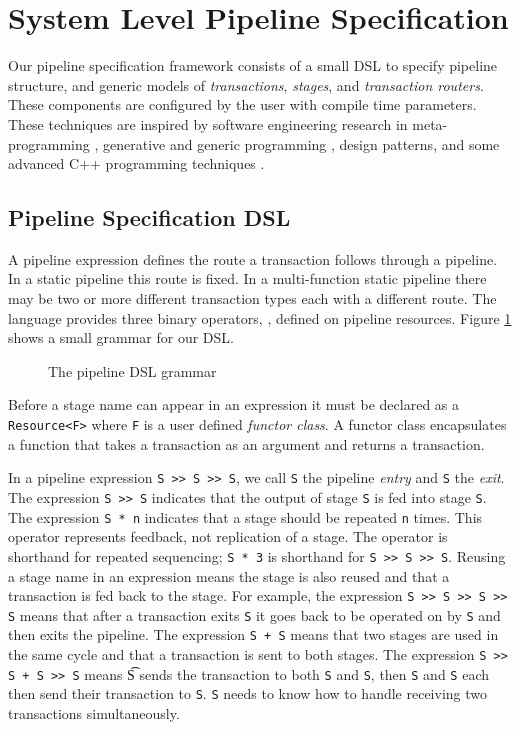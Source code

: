 \documentclass{entcs}
\begin{document}
\section{System Level Pipeline Specification}
Our pipeline specification framework consists of a small DSL to specify pipeline structure,
and generic models of {\em transactions}, {\em stages}, and {\em transaction routers}. These
components are configured by the user with compile time parameters.
These techniques are inspired by software engineering research in meta-programming \cite{Abrahams05},
generative and generic programming \cite{Czarnecki,GPCE07}, design patterns\cite{gof},
and some advanced C++ programming techniques
\cite{Alexandrescu01,veldhuizen95,vandevoorde03}.

\subsection{Pipeline Specification DSL}
A pipeline expression
defines the route a transaction follows through a pipeline. In a static pipeline this route is fixed.
In a multi-function static pipeline there may be two or more different transaction types each
with a different route. The language provides three binary operators, , defined on
pipeline resources. Figure \ref{fig:grammar} shows a small grammar for our DSL.

\begin{figure}[h]

\caption{\label{fig:grammar} The pipeline DSL grammar}
\end{figure}

Before a stage name can appear in an expression it must be declared as a
{\tt Resource<F>} where {\tt F} is a user defined {\em functor
class}. A functor class encapsulates a function that takes a transaction as an argument and
returns a transaction.

In a pipeline expression
{\tt S >> S  >> S},
we call {\tt S} the pipeline {\em entry} and {\tt S} the {\em exit}.
The expression {\tt S >> S} indicates
that the output of stage {\tt S} is fed into stage {\tt S}.
The expression {\tt S * n} indicates that
a stage should be repeated {\tt n} times. This operator represents feedback, not replication of a stage.
The {\tt *} operator is shorthand for repeated
sequencing; {\tt S * 3} is shorthand for {\tt S >> S >> S}.  Reusing a stage name in an
expression means the stage is also reused and that a transaction is fed back to the stage. For example,
the expression {\tt S >> S >> S >> S} means that after a transaction exits {\tt S}
it goes back
to be operated on by {\tt S} and then exits the pipeline. The expression
{\tt S + S} means that two stages are used in the same cycle and that a
transaction is sent to both
stages. The expression {\tt S >> S + S >> S} means {\t S} sends
the transaction to both {\tt S}
and {\tt S}, then {\tt S} and {\tt S} each then send their transaction to {\tt S}.
{\tt S} needs
to know how to handle receiving two transactions simultaneously.
\end{document}
